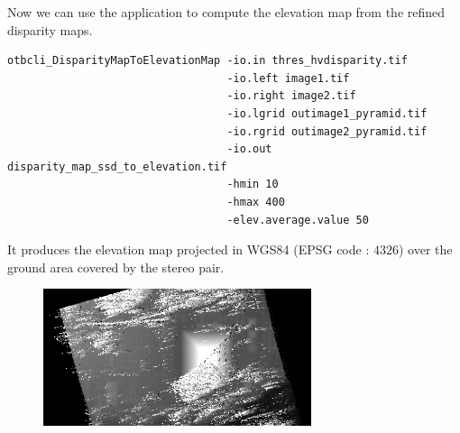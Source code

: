 Now we can use the  application to
compute the elevation map from the refined disparity maps.

\begin{verbatim}
otbcli_DisparityMapToElevationMap -io.in thres_hvdisparity.tif
                                  -io.left image1.tif
                                  -io.right image2.tif
                                  -io.lgrid outimage1_pyramid.tif
                                  -io.rgrid outimage2_pyramid.tif
                                  -io.out disparity_map_ssd_to_elevation.tif
                                  -hmin 10
                                  -hmax 400
                                  -elev.average.value 50
\end{verbatim}

It produces the elevation map projected in WGS84 (EPSG code : $4326$) over the
ground area covered by the stereo pair.

\begin{figure}[!h]
  \center
  \includegraphics[width=0.7\textwidth]{../Art/MonteverdiImages/stereo_dem_zoom.png}
  \label{fig:MeanShiftVectorImageFilter}
\end{figure}
